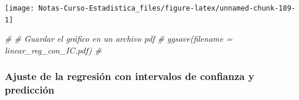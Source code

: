 \documentclass[
  12pt,
]{book}
\newenvironment{Shaded}{\begin{snugshade}}{\end{snugshade}}
\newcommand{\CommentTok}[1]{\textcolor[rgb]{0.56,0.35,0.01}{\textit{#1}}}
\theoremstyle{definition}
\theoremstyle{definition}
\theoremstyle{definition}
\theoremstyle{remark}
\begin{document}
\begin{center}\texttt{[image: Notas-Curso-Estadistica\_files/figure-latex/unnamed-chunk-189-1]} \end{center}

\begin{Shaded}
\begin{Highlighting}[]
\CommentTok{\# \# Guardar el gráfico en un archivo pdf}
\CommentTok{\# ggsave(filename = \textquotesingle{}linear\_reg\_con\_IC.pdf\textquotesingle{}) \# }
\end{Highlighting}
\end{Shaded}

\hypertarget{ajuste-de-la-regresiuxf3n-con-intervalos-de-confianza-y-predicciuxf3n}{%
\subsubsection{Ajuste de la regresión con intervalos de confianza y predicción}\label{ajuste-de-la-regresiuxf3n-con-intervalos-de-confianza-y-predicciuxf3n}}
\end{document}
